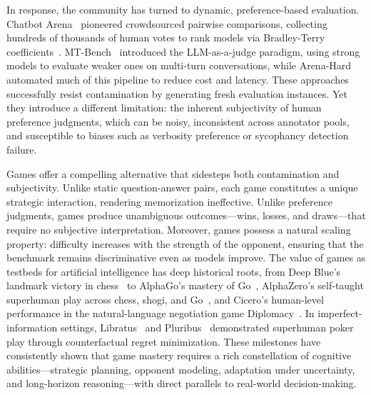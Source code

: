 \documentclass{article}
\begin{document}
In response, the community has turned to dynamic, preference-based evaluation. Chatbot Arena~\citep{chiang2024chatbot} pioneered crowdsourced pairwise comparisons, collecting hundreds of thousands of human votes to rank models via Bradley-Terry coefficients~\citep{bradley1952rank}. MT-Bench~\citep{zheng2023judging} introduced the LLM-as-a-judge paradigm, using strong models to evaluate weaker ones on multi-turn conversations, while Arena-Hard~\citep{li2024crowdsourced} automated much of this pipeline to reduce cost and latency. These approaches successfully resist contamination by generating fresh evaluation instances. Yet they introduce a different limitation: the inherent subjectivity of human preference judgments, which can be noisy, inconsistent across annotator pools, and susceptible to biases such as verbosity preference or sycophancy detection failure.

Games offer a compelling alternative that sidesteps both contamination and subjectivity. Unlike static question-answer pairs, each game constitutes a unique strategic interaction, rendering memorization ineffective. Unlike preference judgments, games produce unambiguous outcomes---wins, losses, and draws---that require no subjective interpretation. Moreover, games possess a natural scaling property: difficulty increases with the strength of the opponent, ensuring that the benchmark remains discriminative even as models improve. The value of games as testbeds for artificial intelligence has deep historical roots, from Deep Blue's landmark victory in chess~\citep{campbell2002deepblue} to AlphaGo's mastery of Go~\citep{silver2016alphago, silver2017mastering}, AlphaZero's self-taught superhuman play across chess, shogi, and Go~\citep{silver2018alphazero}, and Cicero's human-level performance in the natural-language negotiation game Diplomacy~\citep{bakhtin2022cicero}. In imperfect-information settings, Libratus~\citep{brown2018libratus} and Pluribus~\citep{brown2019pluribus} demonstrated superhuman poker play through counterfactual regret minimization. These milestones have consistently shown that game mastery requires a rich constellation of cognitive abilities---strategic planning, opponent modeling, adaptation under uncertainty, and long-horizon reasoning---with direct parallels to real-world decision-making.
\end{document}
